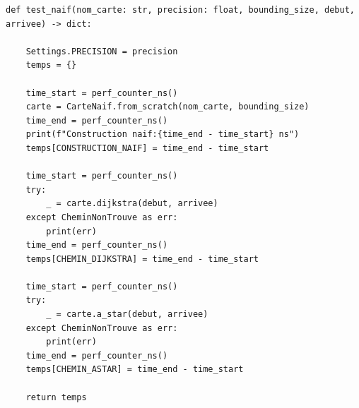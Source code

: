 \begin{frame}[fragile]
\begin{code}
\begin{verbatim}
def test_naif(nom_carte: str, precision: float, bounding_size, debut, arrivee) -> dict:

    Settings.PRECISION = precision
    temps = {}

    time_start = perf_counter_ns()
    carte = CarteNaif.from_scratch(nom_carte, bounding_size)
    time_end = perf_counter_ns()
    print(f"Construction naif:{time_end - time_start} ns")
    temps[CONSTRUCTION_NAIF] = time_end - time_start
    
    time_start = perf_counter_ns()
    try:
        _ = carte.dijkstra(debut, arrivee)
    except CheminNonTrouve as err:
        print(err)
    time_end = perf_counter_ns()
    temps[CHEMIN_DIJKSTRA] = time_end - time_start
    
    time_start = perf_counter_ns()
    try:
        _ = carte.a_star(debut, arrivee)
    except CheminNonTrouve as err:
        print(err)
    time_end = perf_counter_ns()
    temps[CHEMIN_ASTAR] = time_end - time_start
    
    return temps
\end{verbatim}
\end{code}
\end{frame}